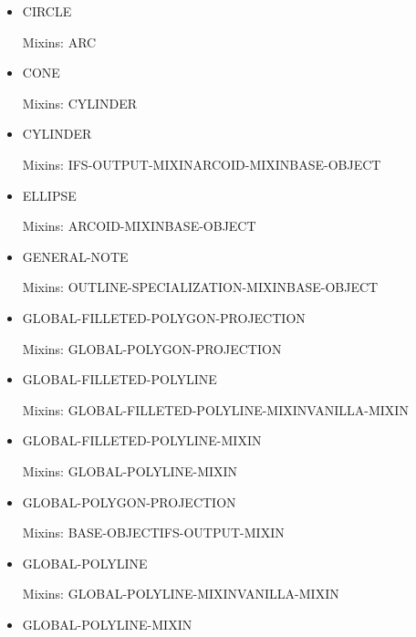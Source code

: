 \documentclass [11pt]{book}
\begin{document}
\begin{itemize}
\item {}CIRCLE

Mixins: ARC



\item {}CONE

Mixins: CYLINDER



\item {}CYLINDER

Mixins: IFS-OUTPUT-MIXINARCOID-MIXINBASE-OBJECT



\item {}ELLIPSE

Mixins: ARCOID-MIXINBASE-OBJECT



\item {}GENERAL-NOTE

Mixins: OUTLINE-SPECIALIZATION-MIXINBASE-OBJECT



\item {}GLOBAL-FILLETED-POLYGON-PROJECTION

Mixins: GLOBAL-POLYGON-PROJECTION



\item {}GLOBAL-FILLETED-POLYLINE

Mixins: GLOBAL-FILLETED-POLYLINE-MIXINVANILLA-MIXIN



\item {}GLOBAL-FILLETED-POLYLINE-MIXIN

Mixins: GLOBAL-POLYLINE-MIXIN



\item {}GLOBAL-POLYGON-PROJECTION

Mixins: BASE-OBJECTIFS-OUTPUT-MIXIN



\item {}GLOBAL-POLYLINE

Mixins: GLOBAL-POLYLINE-MIXINVANILLA-MIXIN



\item {}GLOBAL-POLYLINE-MIXIN


\end{itemize}
\end{document}
